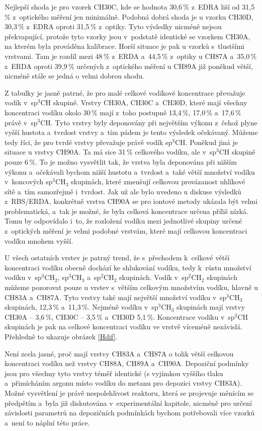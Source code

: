 Nejlepší shoda je pro vzorek CH30C, kde se hodnota 30,6\,\% z~EDRA liší od 31,5\,\% z~optického měření jen minimálně. Podobná dobrá shoda je u vzorku CH30D, 30,3\,\% z~EDRA oproti 31,5\,\% z~optiky. Tyto výsledky nicméně nejsou překvapující, protože tyto vzorky jsou v~podstatě identické se vzorkem CH30A, na kterém byla prováděna kalibrace. Horší situace je pak u vzorků s~tlustšími vrstvami. Tam je rozdíl mezi 48\,\% z~ERDA a~44,5\,\% z~optiky u CH87A a~35,0\,\% z~ERDA oproti 39,9\,\% určených z~optického měření u CH89A již poněkud větší, nicméně stále se jedná o velmi dobrou shodu.

Z tabulky je jasně patrné, že pro malé celkové vodíkové koncentrace převažuje vodík v~sp$^3$CH skupině. Vrstvy CH30A, CH30C a~CH30D, které mají všechny koncentraci vodíku okolo 30\,\% mají z~toho postupně 13,4\,\%, 17,0\,\% a~17,6\,\% právě v~sp$^3$CH. Tyto vrstvy byly deponovány při největším výkonu z~čehož plyne vyšší hustota a~tvrdost vrstvy a~tím pádem je tento výsledek očekávaný. 
Můžeme tedy říci, že pro tvrdé vrstvy převažuje právě vodík sp$^3$CH. Poněkud jiná je situace u vrstvy CH90A. Ta má sice 31\,\% celkového vodíku, ale v~sp$^3$CH skupině pouze 6\,\%. To je možno vysvětlit tak, že vrstva byla deponována při nižším výkonu a~očekávali bychom nižší hustotu a~tvrdost a~také větší množství vodíku v~koncových sp$^3$CH$_3$ skupinách, které zmenšují celkovou provázanost uhlíkové sítě a~tím samozřejmě i~tvrdost. Jak už ale bylo uvedeno u diskuse výsledků z~RBS/ERDA, konkrétně vrstva CH90A se pro iontové metody ukázala být velmi problematická, a~tak je možné, že byla celková koncentrace určena příliš nízká. Tomu by odpovídalo i~to, že rozložení vodíku mezi jednotlivé skupiny určené z~optických měření je velmi podobné vrstvám, které mají celkovou koncentraci vodíku mnohem vyšší.

U všech ostatních vrstev je patrný trend, že s~přechodem k~celkové větší koncentraci vodíku obecně dochází ke shlukování vodíku, tedy k~růstu množství vodíku v~sp$^3$CH$_2$, sp$^3$CH$_3$ a~sp$^2$CH$_2$ skupinách. Vodík v~sp$^2$CH$_2$ skupinách můžeme pozorovat pouze u vrstev s~větším celkovým množstvím vodíku, hlavně u CH83A a~CH87A. Tyto vrstvy také mají největší množství vodíku v~sp$^3$CH$_3$ skupinách, 12,3\,\% a~11,3\,\%. Nejméně vodíku v~sp$^3$CH$_3$ skupinách mají vrstvy CH30A -- 3,6\,\%, CH30C -- 3,5\,\% a~CH30D 5,1\,\%. Koncentrace vodíku v~sp$^2$CH skupinách je pak na celkové koncentraci vodíku ve vrstvě víceméně nezávislá. Přehledně to ukazuje obrázek \ref{Hdif}.

Není zcela jasné, proč mají vrstvy CH83A a~CH87A o tolik větší celkovou koncentraci vodíku než vrstvy CH88A, CH89A a~CH90A. Depoziční podmínky jsou pro všechny tyto vrstvy téměř identické (s vyjímkou vyššího tlaku a~přimícháním argonu místo vodíku do metanu pro depozici vrstvy CH83A). 
Možné vysvětlení je právě nespolehlivost reaktoru, která se projevuje měnícím se předpětím a~byla již diskutována v~experimentální kapitole, nicméně pro určení závislosti parametrů na depozičních podmínkách bychom potřebovali více vzorků a~není to náplní této práce.

